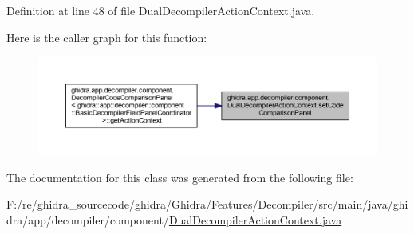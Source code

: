 Definition at line 48 of file Dual\+Decompiler\+Action\+Context.\+java.

Here is the caller graph for this function\+:
\nopagebreak
\begin{figure}[H]
\begin{center}
\leavevmode
\includegraphics[width=350pt]{classghidra_1_1app_1_1decompiler_1_1component_1_1_dual_decompiler_action_context_a26c24ff804bd30e3f81b459dcb8fbe4d_icgraph}
\end{center}
\end{figure}


The documentation for this class was generated from the following file\+:\begin{DoxyCompactItemize}
\item 
F\+:/re/ghidra\+\_\+sourcecode/ghidra/\+Ghidra/\+Features/\+Decompiler/src/main/java/ghidra/app/decompiler/component/\mbox{\hyperlink{_dual_decompiler_action_context_8java}{Dual\+Decompiler\+Action\+Context.\+java}}\end{DoxyCompactItemize}

